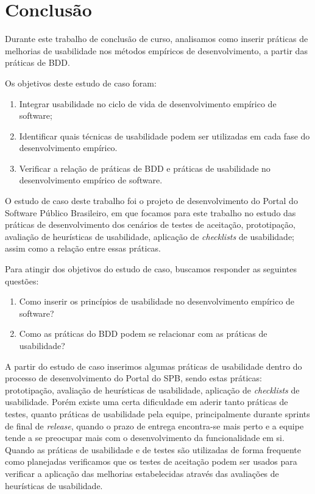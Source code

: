 \chapter{Conclusão}
\label{consideracoes-finais}

Durante este trabalho de conclusão de curso, analisamos como inserir práticas de melhorias de usabilidade nos métodos empíricos de desenvolvimento, a partir das práticas de BDD.

Os objetivos deste estudo de caso foram:
\begin{enumerate}
\item Integrar usabilidade no ciclo de vida de desenvolvimento empírico de software;
\item Identificar quais técnicas de usabilidade  podem ser utilizadas em cada fase do desenvolvimento empírico.
\item Verificar a relação de práticas de BDD e práticas de usabilidade no desenvolvimento empírico de software.
\end{enumerate}

O estudo de caso deste trabalho foi o projeto de desenvolvimento do Portal do Software Público Brasileiro, em que focamos para este trabalho no estudo das práticas de desenvolvimento dos cenários de testes de aceitação, prototipação, avaliação de heurísticas de usabilidade, aplicação de \textit{checklists} de usabilidade; assim como a relação entre essas práticas.

Para atingir dos objetivos do estudo de caso, buscamos responder as seguintes questões:
\begin{enumerate}
\item Como inserir os princípios de usabilidade no desenvolvimento empírico de software?
\item Como as práticas do BDD podem se relacionar com as práticas de usabilidade?
\end{enumerate}

A partir do estudo de caso inserimos algumas práticas de usabilidade dentro do processo de desenvolvimento do Portal do 
SPB, sendo estas práticas: prototipação, avaliação de heurísticas de usabilidade, aplicação de \textit{checklists} de usabilidade. Porém existe uma certa dificuldade em aderir tanto práticas de testes, quanto práticas de usabilidade pela equipe, principalmente durante sprints de final de \textit{release}, quando o prazo de entrega encontra-se mais perto e a equipe tende a se preocupar mais com o desenvolvimento  da funcionalidade em si. Quando as práticas  de usabilidade e de testes são utilizadas de forma frequente como planejadas verificamos que os testes de aceitação podem ser usados para verificar a aplicação das melhorias estabelecidas através das avaliações de heurísticas de usabilidade. 

